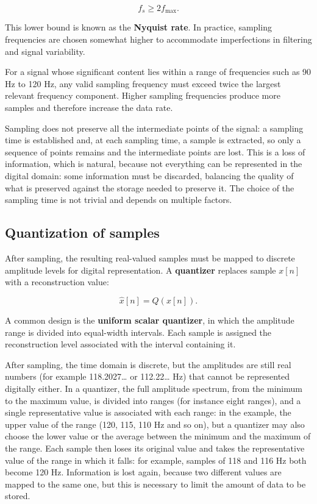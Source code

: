 \[ f_s \ge 2 f_{\max}. \]

This lower bound is known as the \textbf{Nyquist rate}. In practice, sampling frequencies are chosen somewhat higher to accommodate imperfections in filtering and signal variability.

For a signal whose significant content lies within a range of frequencies such as 90 Hz to 120 Hz, any valid sampling frequency must exceed twice the largest relevant frequency component. Higher sampling frequencies produce more samples and therefore increase the data rate.

Sampling does not preserve all the intermediate points of the signal: a sampling time is established and, at each sampling time, a sample is extracted, so only a sequence of points remains and the intermediate points are lost. This is a loss of information, which is natural, because not everything can be represented in the digital domain: some information must be discarded, balancing the quality of what is preserved against the storage needed to preserve it. The choice of the sampling time is not trivial and depends on multiple factors.
\subsection{Quantization of samples}

After sampling, the resulting real-valued samples must be mapped to discrete amplitude levels for digital representation. A \textbf{quantizer} replaces sample $x[n]$ with a reconstruction value:

\[ \hat{x}[n] = Q(x[n]). \]

A common design is the \textbf{uniform scalar quantizer}, in which the amplitude range is divided into equal-width intervals. Each sample is assigned the reconstruction level associated with the interval containing it.

After sampling, the time domain is discrete, but the amplitudes are still real numbers (for example 118.2027\ldots{} or 112.22\ldots{} Hz) that cannot be represented digitally either. In a quantizer, the full amplitude spectrum, from the minimum to the maximum value, is divided into ranges (for instance eight ranges), and a single representative value is associated with each range: in the example, the upper value of the range (120, 115, 110 Hz and so on), but a quantizer may also choose the lower value or the average between the minimum and the maximum of the range. Each sample then loses its original value and takes the representative value of the range in which it falls: for example, samples of 118 and 116 Hz both become 120 Hz. Information is lost again, because two different values are mapped to the same one, but this is necessary to limit the amount of data to be stored.

